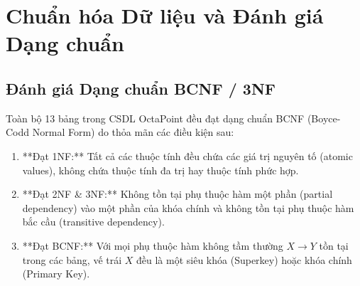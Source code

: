 \section{Chuẩn hóa Dữ liệu và Đánh giá Dạng chuẩn}


\subsection{Đánh giá Dạng chuẩn BCNF / 3NF}
Toàn bộ 13 bảng trong CSDL OctaPoint đều đạt dạng chuẩn BCNF (Boyce-Codd Normal Form) do thỏa mãn các điều kiện sau:
\begin{enumerate}
    \item **Đạt 1NF:** Tất cả các thuộc tính đều chứa các giá trị nguyên tố (atomic values), không chứa thuộc tính đa trị hay thuộc tính phức hợp.
    \item **Đạt 2NF \& 3NF:** Không tồn tại phụ thuộc hàm một phần (partial dependency) vào một phần của khóa chính và không tồn tại phụ thuộc hàm bắc cầu (transitive dependency).
    \item **Đạt BCNF:** Với mọi phụ thuộc hàm không tầm thường $X \rightarrow Y$ tồn tại trong các bảng, vế trái $X$ đều là một siêu khóa (Superkey) hoặc khóa chính (Primary Key).
\end{enumerate}

